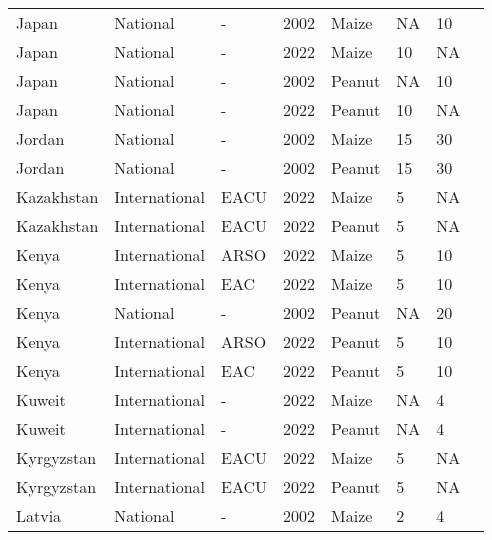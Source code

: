 \begin{landscape}
\begin{longtable}[c]{llllllll}
Japan             & National      & -        & 2002 & Maize  & NA & 10 & \citet{van2004worldwide}     \\
Japan             & National      & -        & 2022 & Maize  & 10 & NA & \citet{FAMIC2015}            \\
Japan             & National      & -        & 2002 & Peanut & NA & 10 & \citet{van2004worldwide}     \\
Japan             & National      & -        & 2022 & Peanut & 10 & NA & \citet{FAMIC2015}            \\
Jordan            & National      & -        & 2002 & Maize  & 15 & 30 & \citet{van2004worldwide}     \\
Jordan            & National      & -        & 2002 & Peanut & 15 & 30 & \citet{van2004worldwide}     \\
Kazakhstan        & International & EACU     & 2022 & Maize  & 5  & NA & \citet{EACU2011}             \\
Kazakhstan        & International & EACU     & 2022 & Peanut & 5  & NA & \citet{EACU2011}             \\
Kenya             & International & ARSO     & 2022 & Maize  & 5  & 10 & \citet{ARSO2022}             \\
Kenya             & International & EAC      & 2022 & Maize  & 5  & 10 & \citet{EAC2018}              \\
Kenya             & National      & -        & 2002 & Peanut & NA & 20 & \citet{van2004worldwide}     \\
Kenya             & International & ARSO     & 2022 & Peanut & 5  & 10 & \citet{ARSO2022}             \\
Kenya             & International & EAC      & 2022 & Peanut & 5  & 10 & \citet{EAC2018}              \\
Kuweit            & International & -        & 2022 & Maize  & NA & 4  & \citet{van2004worldwide}     \\
Kuweit            & International & -        & 2022 & Peanut & NA & 4  & \citet{van2004worldwide}     \\
Kyrgyzstan        & International & EACU     & 2022 & Maize  & 5  & NA & \citet{EACU2011}             \\
Kyrgyzstan        & International & EACU     & 2022 & Peanut & 5  & NA & \citet{EACU2011}             \\
Latvia            & National      & -        & 2002 & Maize  & 2  & 4  & \citet{van2004worldwide}     \\

\end{longtable}
\end{landscape}

